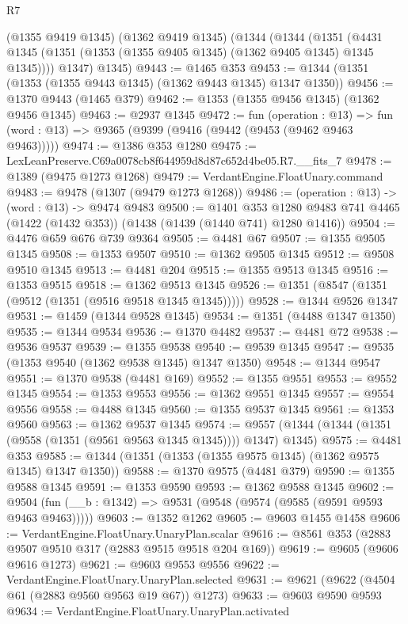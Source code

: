 \begin{lexlean}{R7}
\begin{coremodule}
    (@1355 @9419 @1345)
    (@1362 @9419 @1345)
    (@1344
      (@1344
        (@1351 (@4431 @1345 (@1351 (@1353 (@1355 @9405 @1345) (@1362 @9405 @1345) @1345 @1345))))
        @1347)
      @1345)
@9443 := @1465 @353
@9453 := @1344 (@1351 (@1353 (@1355 @9443 @1345) (@1362 @9443 @1345) @1347 @1350))
@9456 := @1370 @9443 (@1465 @379)
@9462 := @1353 (@1355 @9456 @1345) (@1362 @9456 @1345)
@9463 := @2937 @1345
@9472 := fun (operation : @13) =>
  fun (word : @13) => @9365 (@9399 (@9416 (@9442 (@9453 (@9462 @9463 @9463)))))
@9474 := @1386 @353 @1280
@9475 := LexLeanPreserve.C69a0078cb8f644959d8d87c652d4be05.R7.__fits_7
@9478 := @1389 (@9475 @1273 @1268)
@9479 := VerdantEngine.FloatUnary.command
@9483 := @9478 (@1307 (@9479 @1273 @1268))
@9486 := (operation : @13) -> (word : @13) -> @9474 @9483
@9500 := @1401
    @353
    @1280
    @9483
    @741
    @4465
    (@1422 (@1432 @353))
    (@1438 (@1439 (@1440 @741) @1280 @1416))
@9504 := @4476 @659 @676 @739 @9364
@9505 := @4481 @67
@9507 := @1355 @9505 @1345
@9508 := @1353 @9507
@9510 := @1362 @9505 @1345
@9512 := @9508 @9510 @1345
@9513 := @4481 @204
@9515 := @1355 @9513 @1345
@9516 := @1353 @9515
@9518 := @1362 @9513 @1345
@9526 := @1351 (@8547 (@1351 (@9512 (@1351 (@9516 @9518 @1345 @1345)))))
@9528 := @1344 @9526 @1347
@9531 := @1459 (@1344 @9528 @1345)
@9534 := @1351 (@4488 @1347 @1350)
@9535 := @1344 @9534
@9536 := @1370 @4482
@9537 := @4481 @72
@9538 := @9536 @9537
@9539 := @1355 @9538
@9540 := @9539 @1345
@9547 := @9535 (@1353 @9540 (@1362 @9538 @1345) @1347 @1350)
@9548 := @1344 @9547
@9551 := @1370 @9538 (@4481 @169)
@9552 := @1355 @9551
@9553 := @9552 @1345
@9554 := @1353 @9553
@9556 := @1362 @9551 @1345
@9557 := @9554 @9556
@9558 := @4488 @1345
@9560 := @1355 @9537 @1345
@9561 := @1353 @9560
@9563 := @1362 @9537 @1345
@9574 := @9557 (@1344 (@1344 (@1351 (@9558 (@1351 (@9561 @9563 @1345 @1345)))) @1347) @1345)
@9575 := @4481 @353
@9585 := @1344 (@1351 (@1353 (@1355 @9575 @1345) (@1362 @9575 @1345) @1347 @1350))
@9588 := @1370 @9575 (@4481 @379)
@9590 := @1355 @9588 @1345
@9591 := @1353 @9590
@9593 := @1362 @9588 @1345
@9602 := @9504 (fun (__b : @1342) => @9531 (@9548 (@9574 (@9585 (@9591 @9593 @9463 @9463)))))
@9603 := @1352 @1262
@9605 := @9603 @1455 @1458
@9606 := VerdantEngine.FloatUnary.UnaryPlan.scalar
@9616 := @8561 @353 (@2883 @9507 @9510 @317 (@2883 @9515 @9518 @204 @169))
@9619 := @9605 (@9606 @9616 @1273)
@9621 := @9603 @9553 @9556
@9622 := VerdantEngine.FloatUnary.UnaryPlan.selected
@9631 := @9621 (@9622 (@4504 @61 (@2883 @9560 @9563 @19 @67)) @1273)
@9633 := @9603 @9590 @9593
@9634 := VerdantEngine.FloatUnary.UnaryPlan.activated

\end{coremodule}
\end{lexlean}
